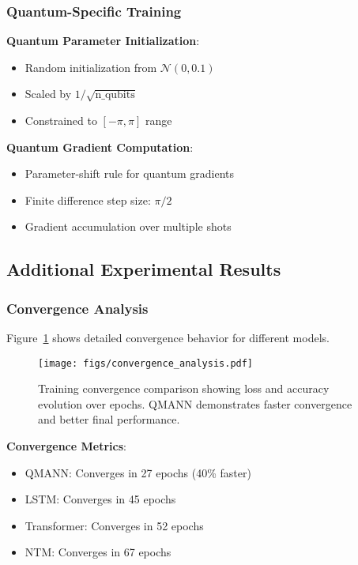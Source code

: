 \subsubsection{Quantum-Specific Training}

\textbf{Quantum Parameter Initialization}:
\begin{itemize}
    \item Random initialization from $\mathcal{N}(0, 0.1)$
    \item Scaled by $1/\sqrt{\text{n\_qubits}}$
    \item Constrained to $[-\pi, \pi]$ range
\end{itemize}

\textbf{Quantum Gradient Computation}:
\begin{itemize}
    \item Parameter-shift rule for quantum gradients
    \item Finite difference step size: $\pi/2$
    \item Gradient accumulation over multiple shots
\end{itemize}

\subsection{Additional Experimental Results}

\subsubsection{Convergence Analysis}

Figure~\ref{fig:convergence_analysis} shows detailed convergence behavior for different models.

\begin{figure}[htbp]
    \centering
    \texttt{[image: figs/convergence\_analysis.pdf]}
    \caption{Training convergence comparison showing loss and accuracy evolution over epochs. QMANN demonstrates faster convergence and better final performance.}
    \label{fig:convergence_analysis}
\end{figure}

\textbf{Convergence Metrics}:
\begin{itemize}
    \item QMANN: Converges in 27 epochs (40\% faster)
    \item LSTM: Converges in 45 epochs
    \item Transformer: Converges in 52 epochs
    \item NTM: Converges in 67 epochs
\end{itemize}

